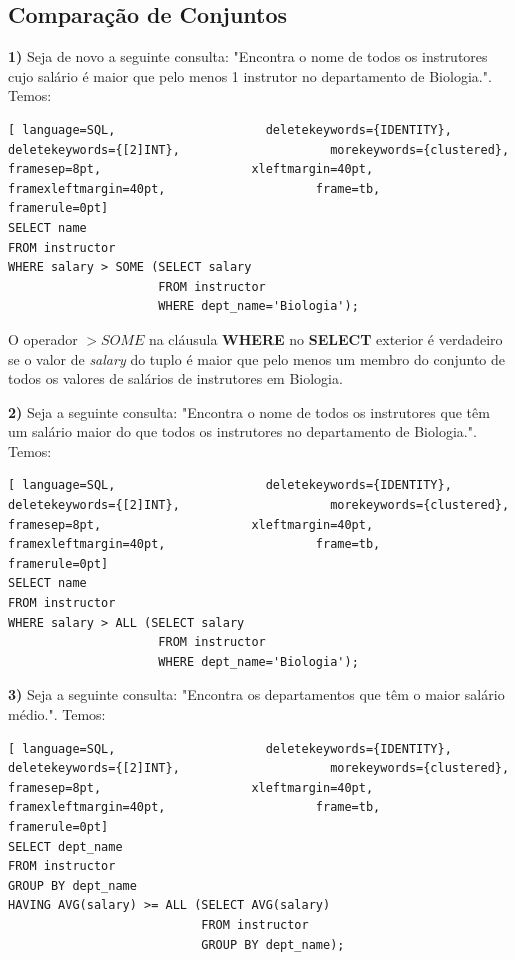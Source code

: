 \documentclass[titlepage]{book}
\theoremstyle{definition}
\begin{document}
\subsection{Comparação de Conjuntos}
\textbf{1)} Seja de novo a seguinte consulta: "Encontra o nome de todos os instrutores cujo salário é maior que pelo menos 1 instrutor no departamento de Biologia.". Temos:
\begin{lstlisting}[ language=SQL,                     deletekeywords={IDENTITY},                     deletekeywords={[2]INT},                     morekeywords={clustered},                     framesep=8pt,                     xleftmargin=40pt,                     framexleftmargin=40pt,                     frame=tb,                     framerule=0pt]
SELECT name
FROM instructor 
WHERE salary > SOME (SELECT salary
                     FROM instructor
                     WHERE dept_name='Biologia');
\end{lstlisting}

O operador $> SOME$ na cláusula \textbf{WHERE} no \textbf{SELECT} exterior é verdadeiro se o valor de \textit{salary} do tuplo é maior que pelo menos um membro do conjunto de todos os valores de salários de instrutores em Biologia.

\textbf{2)} Seja a seguinte consulta: "Encontra o nome de todos os instrutores que têm um salário maior do que todos os instrutores no departamento de Biologia.". Temos:
\begin{lstlisting}[ language=SQL,                     deletekeywords={IDENTITY},                     deletekeywords={[2]INT},                     morekeywords={clustered},                     framesep=8pt,                     xleftmargin=40pt,                     framexleftmargin=40pt,                     frame=tb,                     framerule=0pt]
SELECT name
FROM instructor 
WHERE salary > ALL (SELECT salary
                     FROM instructor
                     WHERE dept_name='Biologia');
\end{lstlisting}

\textbf{3)} Seja a seguinte consulta: "Encontra os departamentos que têm o maior salário médio.". Temos:
\begin{lstlisting}[ language=SQL,                     deletekeywords={IDENTITY},                     deletekeywords={[2]INT},                     morekeywords={clustered},                     framesep=8pt,                     xleftmargin=40pt,                     framexleftmargin=40pt,                     frame=tb,                     framerule=0pt]
SELECT dept_name
FROM instructor 
GROUP BY dept_name
HAVING AVG(salary) >= ALL (SELECT AVG(salary)
                           FROM instructor
                           GROUP BY dept_name);
\end{lstlisting}
\end{document}
